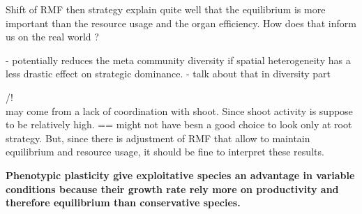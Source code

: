 Shift of RMF then strategy explain quite well that the equilibrium is more important than the resource usage and the organ efficiency. How does that inform us on the real world ?

 - potentially reduces the meta community diversity if spatial heterogeneity has a less drastic effect on strategic dominance. - talk about that in diversity part

/!\\ may come from a lack of coordination with shoot. Since shoot activity is suppose to be relatively high. == might not have besn a good choice to look only at root strategy. But, since there is adjustment of RMF that allow to maintain equilibrium and resource usage, it should be fine to interpret these results.

\textbf{Phenotypic plasticity give exploitative species an advantage in variable conditions because their growth rate rely more on productivity and therefore equilibrium than conservative species. }


%


